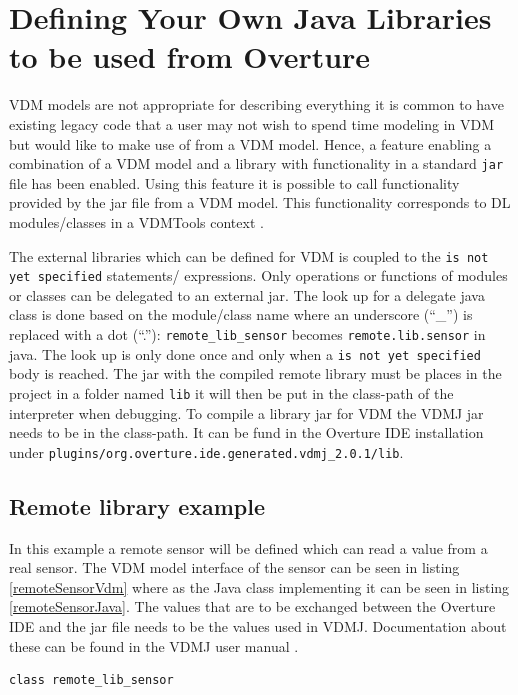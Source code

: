 \documentclass{overturerep}
\begin{document}
{\section{Defining Your Own Java Libraries to be used from Overture}\label{sec:javalibs}

VDM models are not appropriate for describing everything it is common to have existing legacy code that a user may not
wish to spend time modeling in VDM but would like to make use of
from a VDM model. Hence, a feature enabling a combination of a VDM
model and a library with functionality in a standard \texttt{jar} file
has been enabled. Using this feature it is possible 
to call functionality provided by the jar file from a VDM model. This functionality
corresponds to DL modules/classes in a VDMTools context \cite{DLMan}.

The external libraries which can be defined for VDM is coupled to the
\texttt{is not yet specified} statements/ expressions. Only operations
or functions of modules or classes can be delegated to an external
jar. The look up for a delegate java class is done based on the
module/class name where an underscore (``\_'') is replaced with a dot
(``.''): \texttt{remote\_lib\_sensor} becomes
\texttt{remote.lib.sensor} in java. The look up is only done once and
only when a \texttt{is not yet specified} body is
reached. The jar with the compiled remote library must be places in
the project in a folder named \texttt{lib} it will then be put in the
class-path of the interpreter when debugging. To compile a library jar
for VDM the VDMJ jar needs to be in the class-path. It can be fund in
the Overture IDE installation under
\texttt{plugins/org.overture.ide.generated.vdmj\_2.0.1/lib}.

\subsection{Remote library example}

In this example a remote sensor will be defined which can read a
value from a real sensor. The VDM model interface of the sensor can be
seen in listing \ref{remoteSensorVdm} where as the Java class
implementing it can be seen in listing \ref{remoteSensorJava}. The
values that are to be exchanged between the Overture IDE and the jar
file needs to be the values used in VDMJ. Documentation about these
can be found in the VDMJ user manual \cite{Battle09}.

\begin{lstlisting}[language=VDM++,label=remoteSensorVdm,caption=Remote sensor VDM class,captionpos=b]
class remote_lib_sensor


\end{lstlisting}}
\end{document}
